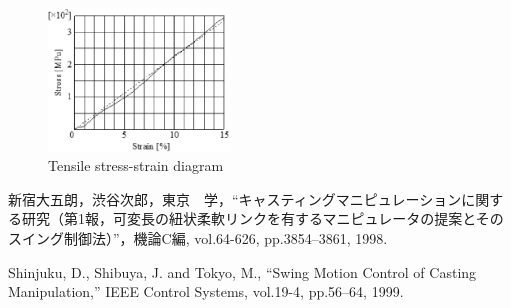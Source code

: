 \documentclass{jarticle}
\begin{document}

\begin{figure}[h]
 \centering
  \includegraphics[height=38mm]{./figs/fig1.eps}
  \vspace*{-4mm}
  \caption{Tensile stress-strain diagram}
  \label{fig: fig1}
\end{figure}


\footnotesize
\begin{thebibliography}{99}

新宿大五朗，渋谷次郎，東京　学，``キャスティングマニピュレーションに関する研究（第1報，可変長の紐状柔軟リンクを有するマニピュレータの提案とそのスイング制御法）''，機論C編, vol.64-626, pp.3854--3861, 1998.

Shinjuku, D., Shibuya, J. and Tokyo, M., ``Swing Motion Control of Casting Manipulation,'' IEEE Control Systems, vol.19-4, pp.56--64, 1999.

\end{thebibliography}

\normalsize
\end{document}

